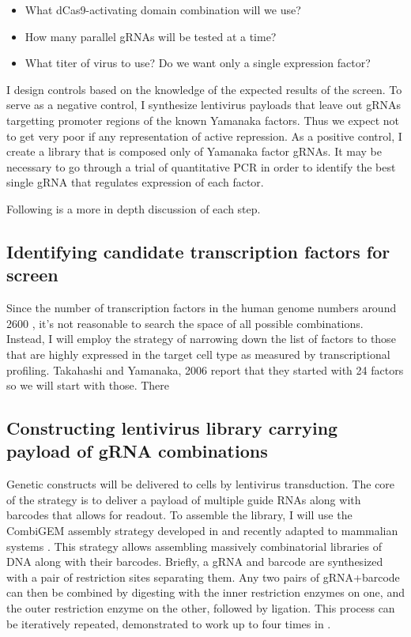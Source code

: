 \documentclass[10pt]{article}
\begin{document}
\begin{itemize}
    \item{What dCas9-activating domain combination will we use?}
    \item{How many parallel gRNAs will be tested at a time?}
    \item{What titer of virus to use? Do we want only a single expression factor?}
\end{itemize}

I design controls based on the knowledge of the expected results of the screen. To serve as a negative control, I synthesize lentivirus payloads that leave out gRNAs targetting promoter regions of the known Yamanaka factors. Thus we expect not to get very poor if any representation of active repression. As a positive control, I create a library that is composed only of Yamanaka factor gRNAs. It may be necessary to go through a trial of quantitative PCR in order to identify the best single gRNA that regulates expression of each factor.

Following is a more in depth discussion of each step.

\subsection*{Identifying candidate transcription factors for screen}

Since the number of transcription factors in the human genome numbers around 2600 \cite{babu2004structure}, it's not reasonable to search the space of all possible combinations. Instead, I will employ the strategy of narrowing down the list of factors to those that are highly expressed in the target cell type as measured by transcriptional profiling. Takahashi and Yamanaka, 2006 report that they started with 24 factors so we will start with those. There


\subsection*{Constructing lentivirus library carrying payload of gRNA combinations}

Genetic constructs will be delivered to cells by lentivirus transduction. The core of the strategy is to deliver a payload of multiple guide RNAs along with barcodes that allows for readout. To assemble the library, I will use the CombiGEM assembly strategy developed in \cite{cheng2014enhanced} and recently adapted to mammalian systems \cite{lu2015combigem}. This strategy allows assembling massively combinatorial libraries of DNA along with their barcodes. Briefly, a gRNA and barcode are synthesized with a pair of restriction sites separating them. Any two pairs of gRNA+barcode can then be combined by digesting with the inner restriction enzymes on one, and the outer restriction enzyme on the other, followed by ligation. This process can be iteratively repeated, demonstrated to work up to four times in \cite{cheng2014enhanced}.
\end{document}
